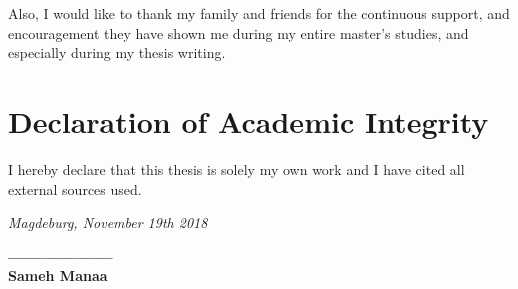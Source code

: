 Also, I would like to thank my family and friends for the continuous support, and encouragement they have shown me during my entire master's studies, and especially during my thesis writing.





{\chapter*{Declaration of Academic Integrity}}

I hereby declare that this thesis is solely my own work and I have cited all external sources used.

\textit{Magdeburg, November 19th 2018} 



\begin{flushright}
\textbf{——————–} \\
\textbf{Sameh Manaa}
\end{flushright}
